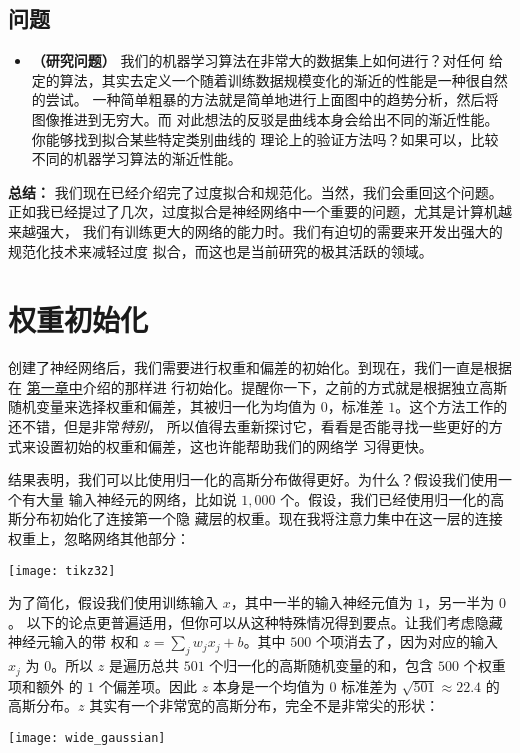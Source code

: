 \subsection*{问题}

\begin{itemize}
\item \textbf{（研究问题）} 我们的机器学习算法在非常大的数据集上如何进行？对任何
  给定的算法，其实去定义一个随着训练数据规模变化的渐近的性能是一种很自然的尝试。
  一种简单粗暴的方法就是简单地进行上面图中的趋势分析，然后将图像推进到无穷大。而
  对此想法的反驳是曲线本身会给出不同的渐近性能。你能够找到拟合某些特定类别曲线的
  理论上的验证方法吗？如果可以，比较不同的机器学习算法的渐近性能。
\end{itemize}

\textbf{总结：} 我们现在已经介绍完了过度拟合和规范化。当然，我们会重回这个问题。
正如我已经提过了几次，过度拟合是神经网络中一个重要的问题，尤其是计算机越来越强大，
我们有训练更大的网络的能力时。我们有迫切的需要来开发出强大的规范化技术来减轻过度
拟合，而这也是当前研究的极其活跃的领域。

\section{权重初始化}
\label{sec:weight_initialization}

创建了神经网络后，我们需要进行权重和偏差的初始化。到现在，我们一直是根据在%
\hyperref[ch:UsingNeuralNetsToRecognizeHandwrittenDigits]{第一章中}介绍的那样进
行初始化。提醒你一下，之前的方式就是根据独立高斯随机变量来选择权重和偏差，其被归一化为均值为 $0$，标准差 $1$。这个方法工作的还不错，但是非常\emph{特别}，
所以值得去重新探讨它，看看是否能寻找一些更好的方式来设置初始的权重和偏差，这也许能帮助我们的网络学
习得更快。

结果表明，我们可以比使用归一化的高斯分布做得更好。为什么？假设我们使用一个有大量
输入神经元的网络，比如说 $1,000$ 个。假设，我们已经使用归一化的高斯分布初始化了连接第一个隐
藏层的权重。现在我将注意力集中在这一层的连接权重上，忽略网络其他部分：
\begin{center}
  \texttt{[image: tikz32]}
\end{center}

为了简化，假设我们使用训练输入 $x$，其中一半的输入神经元值为 $1$，另一半为 $0$。
以下的论点更普遍适用，但你可以从这种特殊情况得到要点。让我们考虑隐藏神经元输入的带
权和 $z=\sum_j w_j x_j + b$。其中 $500$ 个项消去了，因为对应的输入
$x_j$ 为 $0$。所以 $z$ 是遍历总共 $501$ 个归一化的高斯随机变量的和，包含 $500$ 个权重项和额外
的 $1$ 个偏差项。因此 $z$ 本身是一个均值为 $0$ 标准差为 $\sqrt{501} \approx 22.4$
的高斯分布。$z$ 其实有一个非常宽的高斯分布，完全不是非常尖的形状：
\begin{center}
  \texttt{[image: wide\_gaussian]}
\end{center}

